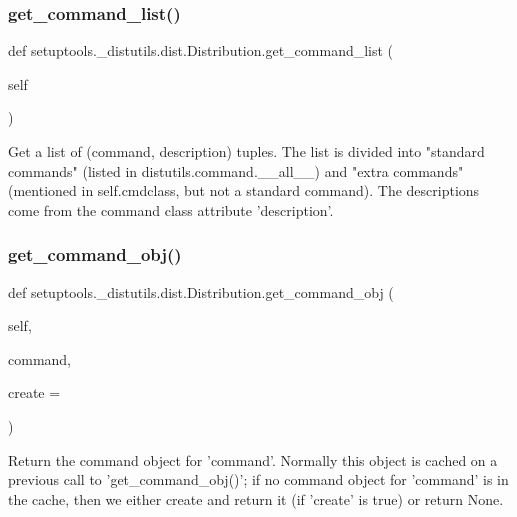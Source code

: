 \subsubsection{\texorpdfstring{get\+\_\+command\+\_\+list()}{get\_command\_list()}}
{\footnotesize\ttfamily def setuptools.\+\_\+distutils.\+dist.\+Distribution.\+get\+\_\+command\+\_\+list (\begin{DoxyParamCaption}\item[{}]{self }\end{DoxyParamCaption})}

\begin{DoxyVerb}Get a list of (command, description) tuples.
The list is divided into "standard commands" (listed in
distutils.command.__all__) and "extra commands" (mentioned in
self.cmdclass, but not a standard command).  The descriptions come
from the command class attribute 'description'.
\end{DoxyVerb}
 \mbox{\label{classsetuptools_1_1__distutils_1_1dist_1_1Distribution_a30efa764f4c2927a684384bfa5bcb198}} 
\subsubsection{\texorpdfstring{get\+\_\+command\+\_\+obj()}{get\_command\_obj()}}
{\footnotesize\ttfamily def setuptools.\+\_\+distutils.\+dist.\+Distribution.\+get\+\_\+command\+\_\+obj (\begin{DoxyParamCaption}\item[{}]{self,  }\item[{}]{command,  }\item[{}]{create = {} }\end{DoxyParamCaption})}

\begin{DoxyVerb}Return the command object for 'command'.  Normally this object
is cached on a previous call to 'get_command_obj()'; if no command
object for 'command' is in the cache, then we either create and
return it (if 'create' is true) or return None.
\end{DoxyVerb}
 \mbox{\label{classsetuptools_1_1__distutils_1_1dist_1_1Distribution_a0a4e6195d41a730220461eefd9abb64b}} 
